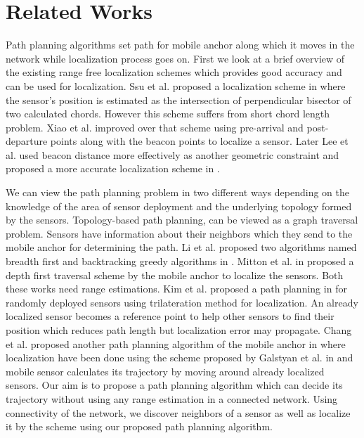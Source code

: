 \documentclass[preprint,11pt]{elsarticle}
\begin{document}
\section{Related Works}
\label{sec:reltdwrk}
Path planning algorithms set path for mobile anchor along which it moves in
the network while localization process goes on. First we look at a
brief overview of the existing range free localization schemes which provides
good accuracy and can be used for localization. Ssu et al. proposed
a localization scheme in \cite{Ssu2005} where the sensor's position is estimated as the
intersection of perpendicular bisector of two calculated chords.
However this scheme suffers from short chord length problem. Xiao et al.\cite{Xiao2008} improved
over that scheme using pre-arrival and post-departure points along with the beacon points
to localize a sensor. Later Lee et al. used beacon distance more effectively as another
geometric constraint and proposed a more accurate localization scheme in \cite{Lee2009}.


We can view the path planning problem in two different ways depending on the knowledge of the area of sensor deployment
and the underlying topology formed by the sensors. Topology-based path planning, can be viewed as a
graph traversal problem. Sensors have information about their neighbors which they send to the mobile anchor
for determining the path. Li et al. proposed two algorithms named breadth first
and backtracking greedy algorithms in \cite{Li2008}.
Mitton et al. in \cite{Mitton2012} proposed a depth first traversal scheme by the mobile anchor
to localize the sensors. Both these works need range estimations.
Kim et al. proposed a path planning in \cite{Kim2011} for  randomly deployed sensors
using trilateration method for localization. An already localized sensor
becomes a reference point to help other sensors to find their position
which reduces path length but localization error may propagate.
Chang  et al. proposed another path planning algorithm of the mobile anchor
in \cite{Chang2012} where localization have been done using the scheme proposed by Galstyan et al.
in \cite{Galstyan2004} and mobile sensor calculates its trajectory by moving around already localized sensors.
Our aim is to propose a path planning algorithm which can decide its trajectory without using any range
estimation in a connected network. Using connectivity of the network, we discover neighbors of a sensor as
well as localize it by the scheme \cite{Lee2009} using our proposed path planning algorithm.
\end{document}
